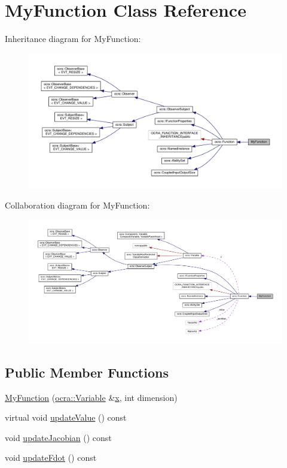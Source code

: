 \hypertarget{classMyFunction}{}\section{My\+Function Class Reference}
\label{classMyFunction}


Inheritance diagram for My\+Function\+:
\nopagebreak
\begin{figure}[H]
\begin{center}
\leavevmode
\includegraphics[width=350pt]{d7/d61/classMyFunction__inherit__graph}
\end{center}
\end{figure}


Collaboration diagram for My\+Function\+:
\nopagebreak
\begin{figure}[H]
\begin{center}
\leavevmode
\includegraphics[width=350pt]{da/de1/classMyFunction__coll__graph}
\end{center}
\end{figure}
\subsection*{Public Member Functions}
\begin{DoxyCompactItemize}
\item 
\hyperlink{classMyFunction_addcad41fa4e120bf9decb70b4b22f935}{My\+Function} (\hyperlink{classocra_1_1Variable}{ocra\+::\+Variable} \&\hyperlink{classocra_1_1Function_a28825886d1f149c87b112ec2ec1dd486}{x}, int dimension)
\item 
virtual void \hyperlink{classMyFunction_a4709dc5d78f30355ca98c3254eb47345}{update\+Value} () const 
\item 
void \hyperlink{classMyFunction_a748636ef454d9b73b6c3856942f07c6d}{update\+Jacobian} () const 
\item 
void \hyperlink{classMyFunction_a8abb122de0a52d9d77ced1b6dde4f40d}{update\+Fdot} () const 
\end{DoxyCompactItemize}
